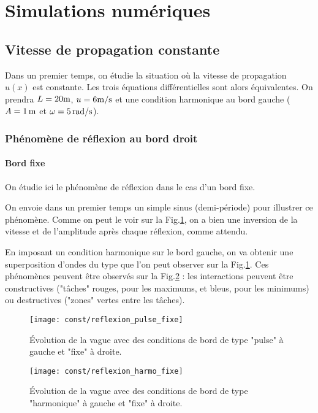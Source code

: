 \documentclass[a4paper,12pt,oneside]{article}
\begin{document}
\section{Simulations numériques}
\subsection{Vitesse de propagation constante}
Dans un premier temps, on étudie la situation où la vitesse de propagation $u(x)$ est constante. Les trois équations différentielles sont alors équivalentes. On prendra $L=20\rm m$, $u=6 \rm m/s$ et une condition harmonique au bord gauche ($A=1 \,\rm m$ et $\omega=5 \, \rm rad/s$).

\subsubsection{Phénomène de réflexion au bord droit}

\paragraph{Bord fixe} On étudie ici le phénomène de réflexion dans le cas d'un bord fixe.

On envoie dans un premier temps un simple sinus (demi-période) pour illustrer ce phénomène. Comme on peut le voir sur la Fig.\ref{fig:reflexion_pulse_fixe}, on a bien une inversion de la vitesse et de l'amplitude après chaque réflexion, comme attendu.

En imposant un condition harmonique sur le bord gauche, on va obtenir une superposition d'ondes du type que l'on peut observer sur la Fig.\ref{fig:reflexion_pulse_fixe}. Ces phénomènes peuvent être observés sur la Fig.\ref{fig:reflexion_harmo_fixe} : les interactions peuvent être constructives ("tâches" rouges, pour les maximums, et bleus, pour les minimums) ou destructives ("zones" vertes entre les tâches).

\begin{figure}[H]
    \centering
    \texttt{[image: const/reflexion\_pulse\_fixe]}
    \caption{Évolution de la vague avec des conditions de bord de type "pulse" à gauche et "fixe" à droite.}
    \label{fig:reflexion_pulse_fixe}
\end{figure}

\begin{figure}[H]
    \centering
    \texttt{[image: const/reflexion\_harmo\_fixe]}
    \caption{Évolution de la vague avec des conditions de bord de type "harmonique" à gauche et "fixe" à droite.}
    \label{fig:reflexion_harmo_fixe}
\end{figure}
\end{document}
